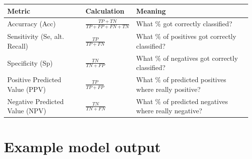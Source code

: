 \renewcommand{\arraystretch}{1.5}
\begin{table}[h!]
    \centering
    \begin{tabular}{p{3cm} p{3cm} p{4cm}}
        Metric & Calculation & Meaning \\
        \hline
        Accurracy \newline (Acc) & $\frac{TP+TN}{TP+FP+FN+TN}$ & What \% got \newline correctly classified? \\
        Sensitivity \newline (Se, alt. Recall) & $\frac{TP}{TP+FN}$ & What \% of positives \newline got correctly \newline classified? \\
        Specificity \newline (Sp) & $\frac{TN}{TN+FP}$ & What \% of negatives \newline got correctly \newline classified? \\
        Positive Predicted \newline Value (PPV) & $\frac{TP}{TP+FP}$ & What \% of predicted \newline positives where \newline really positive? \\
        Negative Predicted \newline Value (NPV) & $\frac{TN}{TN+FN}$ & What \% of predicted \newline negatives where \newline really negative? \\
    \end{tabular}
\end{table}

\newpage
\section{Example model output \label{Apx-Output}}

